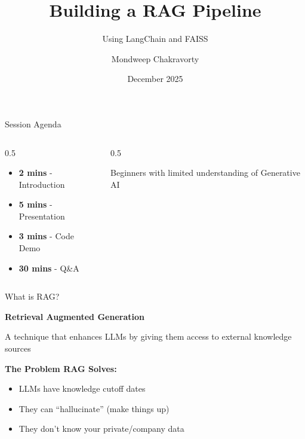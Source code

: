 \documentclass[aspectratio=169]{beamer}
\title[RAG Pipeline]{\textbf{Building a RAG Pipeline}}
\subtitle{Using LangChain and FAISS}
\author{Mondweep Chakravorty}
\institute{Knowledge Sharing Session}
\date{December 2025}
\begin{document}
\begin{frame}
    \titlepage
\end{frame}

\begin{frame}{Session Agenda}
    \begin{columns}
        \begin{column}{0.5\textwidth}
            \begin{itemize}
                \item \textbf{2 mins} - Introduction
                \item \textbf{5 mins} - Presentation
                \item \textbf{3 mins} - Code Demo
                \item \textbf{30 mins} - Q\&A
            \end{itemize}
        \end{column}
        \begin{column}{0.5\textwidth}
            \begin{tcolorbox}[colback=ragblue!10, colframe=ragblue, title=Target Audience]
                Beginners with limited understanding of Generative AI
            \end{tcolorbox}
        \end{column}
    \end{columns}
\end{frame}

\begin{frame}{What is RAG?}
    \begin{center}
        \Huge\textbf{\textcolor{ragblue}{R}etrieval \textcolor{ragpurple}{A}ugmented \textcolor{ragblue}{G}eneration}
    \end{center}

    \vspace{1em}

    \begin{tcolorbox}[colback=ragpurple!10, colframe=ragpurple]
        A technique that enhances LLMs by giving them access to external knowledge sources
    \end{tcolorbox}

    \vspace{1em}

    \textbf{The Problem RAG Solves:}
    \begin{itemize}
        \item LLMs have knowledge cutoff dates
        \item They can ``hallucinate'' (make things up)
        \item They don't know your private/company data
    \end{itemize}
\end{frame}
\end{document}
